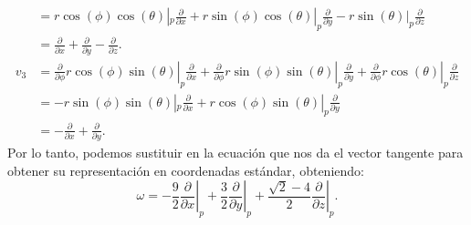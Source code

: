 \begin{example}
\begin{align*}
		    & = r\cos(\phi)\cos(\theta)|_p \frac{\partial}{\partial x}
		+ r\sin(\phi)\cos(\theta)|_p  \frac{\partial}{\partial y}
		- r\sin(\theta)|_p \frac{\partial}{\partial z}                       \\
		    & = \frac{\partial}{\partial x} + \frac{\partial }{\partial y}
		- \frac{\partial}{\partial z}.                                       \\
		v_3 & =
		\left. \frac{\partial}{\partial \phi} r\cos(\phi)\sin(\theta) \right|_p
		\frac{\partial}{\partial x} +
		\left. \frac{\partial}{\partial \phi} r\sin(\phi)\sin(\theta)\right|_p
		\frac{\partial}{\partial y} +
		\left. \frac{\partial}{\partial \phi} r\cos(\theta)\right|_{p}
		\frac{\partial}{\partial z}                                          \\
		    & = -r\sin(\phi)\sin(\theta)|_p \frac{\partial}{\partial x}
		+ r\cos(\phi)\sin(\theta)|_p  \frac{\partial}{\partial y}            \\
		    & = - \frac{\partial}{\partial x} + \frac{\partial}{\partial y}.
	\end{align*}
	Por lo tanto, podemos sustituir en la ecuación que nos da el vector tangente para obtener su representación en coordenadas estándar, obteniendo:
	\[ \omega =
		\left. -\frac{9}{2} \frac{\partial}{\partial x} \right|_p +
		\left. \frac{3}{2}\frac{\partial}{\partial y} \right|_p +
		\left. \frac{\sqrt{2} - 4}{2} \frac{\partial}{\partial z} \right|_p .\]
\end{example}
